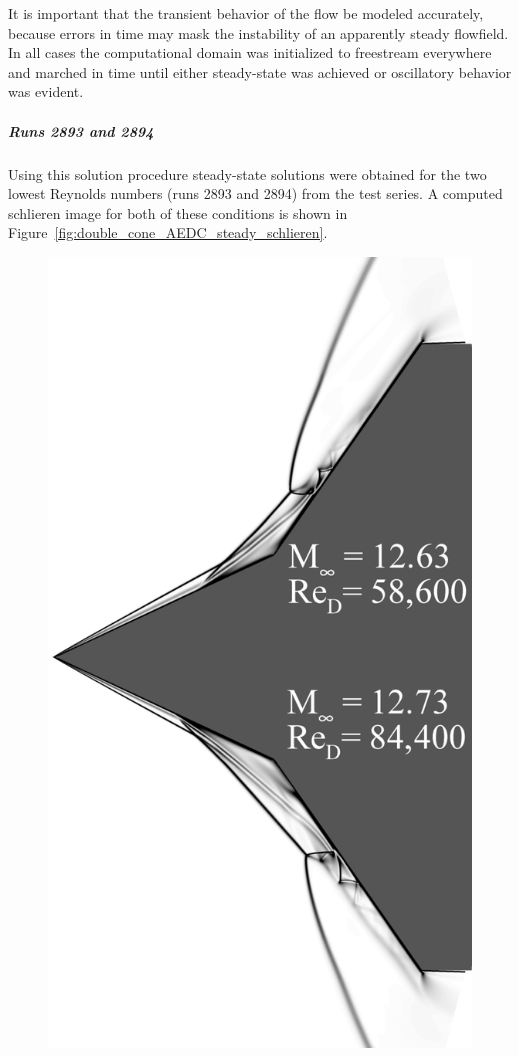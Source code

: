  It is important that the transient behavior of the flow be modeled accurately, because errors in time may mask the instability of an apparently steady flowfield.  In all cases the computational domain was initialized to freestream everywhere and marched in time until either steady-state was achieved or oscillatory behavior was evident.

\subparagraph{Runs 2893 and 2894}

Using this solution procedure steady-state solutions were obtained for the two lowest Reynolds numbers (runs 2893 and 2894) from the test series.  A computed schlieren image for both of these conditions is shown in Figure~\ref{fig:double_cone_AEDC_steady_schlieren}.
\begin{figure}[hbtp]
  \begin{center}
    \includegraphics[height=.875\textheight]{figures/aedc_double_cone/2893_2894_composite_schlieren}

\end{center}
\end{figure}
